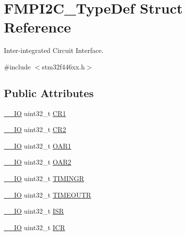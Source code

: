 \hypertarget{struct_f_m_p_i2_c___type_def}{}\section{F\+M\+P\+I2\+C\+\_\+\+Type\+Def Struct Reference}
\label{struct_f_m_p_i2_c___type_def}


Inter-\/integrated Circuit Interface.  




{\ttfamily \#include $<$stm32f446xx.\+h$>$}

\subsection*{Public Attributes}
\begin{DoxyCompactItemize}
\item 
\hyperlink{core__sc300_8h_aec43007d9998a0a0e01faede4133d6be}{\+\_\+\+\_\+\+IO} uint32\+\_\+t \hyperlink{struct_f_m_p_i2_c___type_def_a68e7df34b14feaacd9d8a65d94bef8cd}{C\+R1}
\item 
\hyperlink{core__sc300_8h_aec43007d9998a0a0e01faede4133d6be}{\+\_\+\+\_\+\+IO} uint32\+\_\+t \hyperlink{struct_f_m_p_i2_c___type_def_ab0699c00e17f4a1abfbed45e2f393612}{C\+R2}
\item 
\hyperlink{core__sc300_8h_aec43007d9998a0a0e01faede4133d6be}{\+\_\+\+\_\+\+IO} uint32\+\_\+t \hyperlink{struct_f_m_p_i2_c___type_def_ac71603691436249749d520945662c67a}{O\+A\+R1}
\item 
\hyperlink{core__sc300_8h_aec43007d9998a0a0e01faede4133d6be}{\+\_\+\+\_\+\+IO} uint32\+\_\+t \hyperlink{struct_f_m_p_i2_c___type_def_ad0de14c40e6bd491429a5f488a5a8814}{O\+A\+R2}
\item 
\hyperlink{core__sc300_8h_aec43007d9998a0a0e01faede4133d6be}{\+\_\+\+\_\+\+IO} uint32\+\_\+t \hyperlink{struct_f_m_p_i2_c___type_def_a63e23e589c78e9931cb75dab1d4f5d7a}{T\+I\+M\+I\+N\+GR}
\item 
\hyperlink{core__sc300_8h_aec43007d9998a0a0e01faede4133d6be}{\+\_\+\+\_\+\+IO} uint32\+\_\+t \hyperlink{struct_f_m_p_i2_c___type_def_a32077009469569f88bb1858c242b571b}{T\+I\+M\+E\+O\+U\+TR}
\item 
\hyperlink{core__sc300_8h_aec43007d9998a0a0e01faede4133d6be}{\+\_\+\+\_\+\+IO} uint32\+\_\+t \hyperlink{struct_f_m_p_i2_c___type_def_a343fdd6a2532f4ef56bf3f7a69a6e327}{I\+SR}
\item 
\hyperlink{core__sc300_8h_aec43007d9998a0a0e01faede4133d6be}{\+\_\+\+\_\+\+IO} uint32\+\_\+t \hyperlink{struct_f_m_p_i2_c___type_def_abd0e6fed9da5869967e2570a84055143}{I\+CR}

\end{DoxyCompactItemize}
